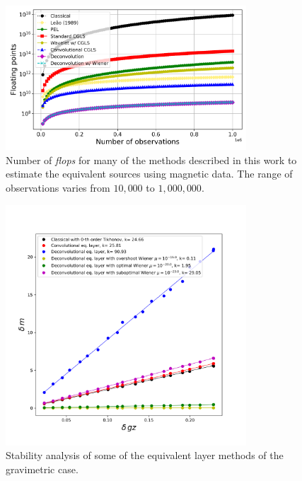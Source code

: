 \begin{figure}[htbp]
	\begin{center}
		\includegraphics[width=9cm]{Fig/flops_mag}%
	\end{center}
	\caption{Number of \textit{flops} for many of the methods described in this work to estimate the equivalent sources using magnetic data. The range of observations varies from $10,000$ to $1,000,000$.}
	\label{fig:2}
\end{figure}

\begin{figure}[htbp]
	\begin{center}
		\includegraphics[width=9cm]{Fig/stability_grav}
	\end{center}
	\caption{Stability analysis of some of the equivalent layer methods of the gravimetric case.}
	\label{fig:3}
\end{figure}

